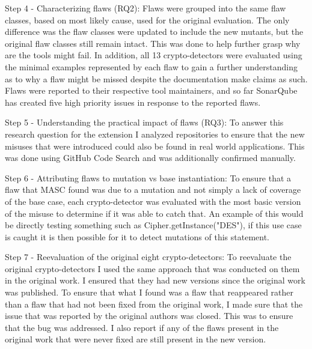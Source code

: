 Step 4 - Characterizing flaws (RQ2): Flaws were grouped into the same flaw classes, based on most likely cause, used for the original evaluation. The only difference was the flaw classes were updated to include the new mutants, but the original flaw classes still remain intact. This was done to help further grasp why are the tools might fail. In addition, all 13 crypto-detectors were evaluated using the minimal examples represented by each flaw to gain a further understanding as to why a flaw might be missed despite the documentation make claims as such. Flaws were reported to their respective tool maintainers, and so far SonarQube has created five high priority issues in response to the reported flaws.

Step 5 - Understanding the practical impact of flaws (RQ3): To answer this research question for the extension I analyzed repositories to ensure that the new misuses that were introduced could also be found in real world applications. This was done using GitHub Code Search and was additionally confirmed manually.

Step 6 - Attributing flaws to mutation vs base instantiation: To ensure that a flaw that MASC found was due to a mutation and not simply a lack of coverage of the base case, each crypto-detector was evaluated with the most basic version of the misuse to determine if it was able to catch that. An example of this would be directly testing something such as Cipher.getInstance("DES"), if this use case is caught it is then possible for it to detect mutations of this statement.

Step 7 - Reevaluation of the original eight crypto-detectors: To reevaluate the original crypto-detectors I used the same approach that was conducted on them in the original work. I ensured that they had new versions since the original work was published. To ensure that what I found was a flaw that reappeared rather than a flaw that had not been fixed from the original work, I made sure that the issue that was reported by the original authors was closed. This was to ensure that the bug was addressed. I also report if any of the flaws present in the original work that were never fixed are still present in the new version.